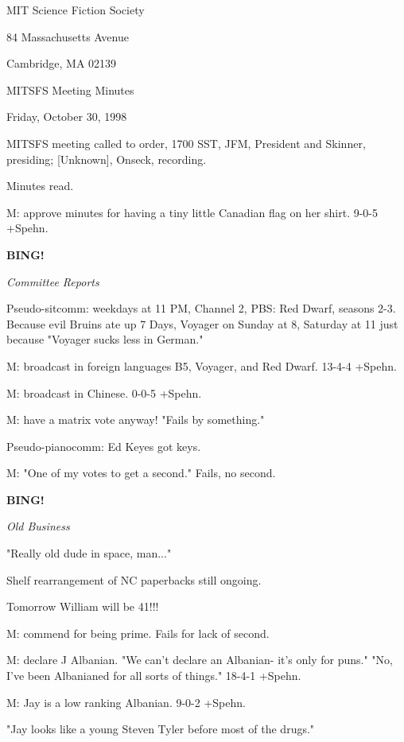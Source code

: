 \documentclass[12pt]{article}
\newcommand{\bing}{{\bf BING!} }
\newcommand{\goto}[1]{\bing \vskip 12pt \centerline{{\em{#1}}}}
\begin{document}
\begin{center}

MIT Science Fiction Society 

84 Massachusetts Avenue

Cambridge, MA 02139

\vspace{12pt}

MITSFS Meeting Minutes 

Friday, October 30, 1998

\end{center}
 
\vspace{18pt}

\setlength{\parskip}{6pt}

\noindent
MITSFS meeting called to order, 1700 SST,
JFM, President and Skinner, presiding; [Unknown], Onseck, recording.

Minutes read.

M: approve minutes for having a tiny little Canadian flag on her shirt. 9-0-5 +Spehn.

\goto{Committee Reports}

Pseudo-sitcomm: weekdays at 11 PM, Channel 2, PBS: Red Dwarf, seasons 2-3. Because evil Bruins ate up 7 Days, Voyager on Sunday at 8, Saturday at 11 just because "Voyager sucks less in German."

M: broadcast in foreign languages B5, Voyager, and Red Dwarf. 13-4-4 +Spehn.

M: broadcast in Chinese. 0-0-5 +Spehn.

M: have a matrix vote anyway! "Fails by something."

Pseudo-pianocomm: Ed Keyes got keys.

M: "One of my votes to get a second." Fails, no second.

\goto{Old Business}

"Really old dude in space, man..."

Shelf rearrangement of NC paperbacks still ongoing.

Tomorrow William will be 41!!!

M: commend for being prime. Fails for lack of second.

M: declare J Albanian. "We can't declare an Albanian- it's only for puns." "No, I've been Albanianed for all sorts of things." 18-4-1 +Spehn.

M: Jay is a low ranking Albanian. 9-0-2 +Spehn.

"Jay looks like a young Steven Tyler before most of the drugs."
\end{document}

